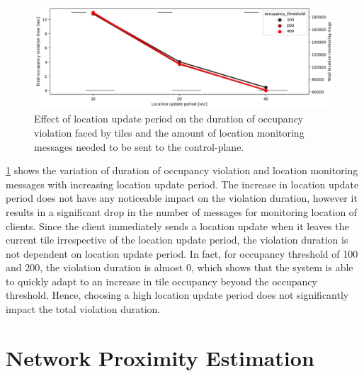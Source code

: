 \begin{figure}
\centering
\includegraphics[width=\linewidth]{figures/design_space/spatial/loc_update_period_tradeoff.png}
\caption{Effect of location update period on the duration of occupancy violation faced by tiles and the amount of location monitoring messages needed to be sent to the control-plane.}
\label{fig:location_update_period}
\end{figure}
\cref{fig:location_update_period} shows the variation of duration of occupancy violation and location monitoring messages with increasing location update period. The increase in location update period does not have any noticeable impact on the violation duration, however it results in a significant drop in the number of messages for monitoring location of clients. Since the client immediately sends a location update when it leaves the current tile irrespective of the location update period, the violation duration is not dependent on location update period. In fact, for occupancy threshold of 100 and 200, the violation duration is almost 0, which shows that the system is able to quickly adapt to an increase in tile occupancy beyond the occupancy threshold. Hence, choosing a high location update period does not significantly impact the total violation duration.

\section{Network Proximity Estimation}

